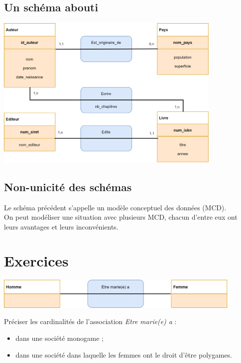 \documentclass[10pt,cours,a4paper,firamath]{nsi}
\begin{document}
\subsection{Un schéma abouti}
\begin{center}
    \includegraphics[width=11cm]{img/schema_2}
\end{center}

\subsection{Non-unicité des schémas}
Le schéma précédent s'appelle un modèle conceptuel des données (MCD).\\
On peut modéliser une situation avec plusieurs MCD, chacun d'entre eux ont leurs avantages et leurs inconvénients.

\section{Exercices}

\begin{exercice}[]
    \begin{center}
        \includegraphics[width=12cm]{img/ex1}
    \end{center}
    Préciser les cardinalités de l'association \textit{Etre marie(e) a} :
    \begin{itemize}
        \item 	dans une société monogame ;
        \item 	dans une société dans laquelle les femmes ont le droit d'être polygames.
    \end{itemize}
\end{exercice}
\end{document}
